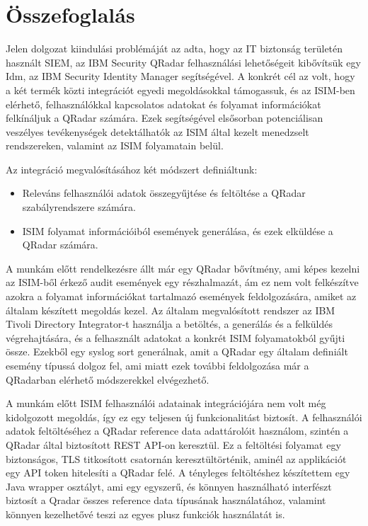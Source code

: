 \chapter{Összefoglalás}
\label{ch:sum}

Jelen dolgozat kiindulási problémáját az adta, hogy az IT biztonság területén használt SIEM, az IBM Security QRadar felhasználási lehetőségeit kibővítsük egy Idm, az IBM Security Identity Manager segítségével. A konkrét cél az volt, hogy a két termék közti integrációt egyedi megoldásokkal támogassuk, és az ISIM-ben elérhető, felhasználókkal kapcsolatos adatokat és folyamat információkat felkínáljuk a QRadar számára. Ezek segítségével elsősorban potenciálisan veszélyes tevékenységek detektálhatók az ISIM által kezelt menedzselt rendszereken, valamint az ISIM folyamatain belül.

Az integráció megvalósításához két módszert definiáltunk:
\begin{itemize}
	\item Releváns felhasználói adatok összegyűjtése és feltöltése a QRadar szabályrendszere számára.
	\item ISIM folyamat információiból események generálása, és ezek elküldése a QRadar számára.
\end{itemize}

A munkám előtt rendelkezésre állt már egy QRadar bővítmény, ami képes kezelni az ISIM-ből érkező audit események egy részhalmazát, ám ez nem volt felkészítve azokra a folyamat információkat tartalmazó események feldolgozására, amiket az általam készített megoldás kezel. Az általam megvalósított rendszer az IBM Tivoli Directory Integrator-t használja a betöltés, a generálás és a felküldés végrehajtására, és a felhasznált adatokat a konkrét ISIM folyamatokból gyűjti össze. Ezekből egy syslog sort generálnak, amit a QRadar egy általam definiált esemény típussá dolgoz fel, ami miatt ezek további feldolgozása már a QRadarban elérhető módszerekkel elvégezhető.

A munkám előtt ISIM felhasználói adatainak integrációjára nem volt még kidolgozott megoldás, így ez egy teljesen új funkcionalitást biztosít. A felhasználói adatok feltöltéséhez a QRadar reference data adattárolóit használom, szintén a QRadar által biztosított REST API-on keresztül. Ez a feltöltési folyamat egy biztonságos, TLS titkosított csatornán keresztültörténik, aminél az applikációt egy API token hitelesíti a QRadar felé. A tényleges feltöltéshez készítettem egy Java wrapper osztályt, ami egy egyszerű, és könnyen használható interfészt biztosít a Qradar összes reference data típusának használatához, valamint könnyen kezelhetővé teszi az egyes plusz funkciók használatát is.

